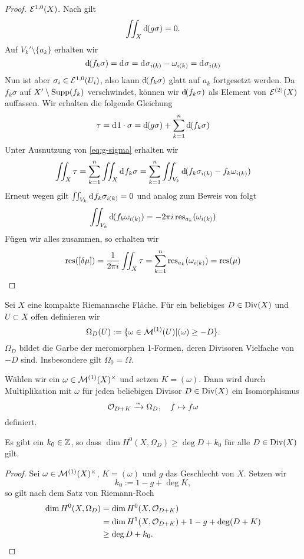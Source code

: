\begin{proof}
  $\mathcal{E}^{1,0}(X)$. Nach \cite[Satz 10.20]{For} gilt
  \begin{align}
  \iint_X \d[(g \sigma)] = 0. \label{eq:g-sigma}
  \end{align}
  Auf $V_k' \setminus \{a_k\}$ erhalten wir
  \[
  \d[(f_k \sigma)] = \d[\sigma] = \d[\sigma_{i(k)} - \omega_{i(k)}] =
  \d[\sigma_{i(k)}]
  \]
  Nun ist aber $\sigma_i \in \mathcal{E}^{1,0}(U_i)$, also kann $\d[(f_k
  \sigma)]$ glatt auf $a_k$ fortgesetzt werden. Da $f_k\sigma$ auf $X'
  \setminus \operatorname{Supp}(f_k)$ verschwindet, können wir $\d[(f_k \sigma)]$
  als Element von $\mathcal{E}^{(2)}(X)$ auffassen. Wir erhalten die
  folgende Gleichung
  \[
  \tau = \d[1 \cdot \sigma] = \d[(g\sigma)] + \sum_{k=1}^n \d[(f_k
  \sigma)]
  \]
  Unter Ausnutzung von \eqref{eq:g-sigma} erhalten wir
  \[
  \iint_X \tau = \sum_{k=1}^n \iint_X \d[f_k \sigma] = \sum_{k=1}^n
  \iint_{V_k} \d[(f_k\sigma_{i(k)} - f_k \omega_{i(k)} )]
  \]
  Erneut wegen \cite[Satz 10.20]{For} gilt $\iint_{V_k} \d[f_k \sigma_{i(k)}] = 0$ und
  analog zum Beweis von \cite[Satz 10.21]{For} folgt
  \[
  \iint_{V_k} \d[(f_k \omega_{i(k)})] = - 2\pi i
  \res_{a_k}(\omega_{i(k)})
  \]
  Fügen wir alles zusammen, so erhalten wir
  \[
  \operatorname{res}([\delta \mu]) = \frac{1}{2\pi i} \iint_X \tau = \sum_{k=1}^n
  \operatorname{res}_{a_k}(\omega_{i(k)}) = \operatorname{res}(\mu)
  \]
\end{proof}

\begin{defin}
  \label{def:garbe-div}
  Sei $X$ eine kompakte Riemannsche Fläche. Für ein beliebiges $D \in
  \operatorname{Div}(X)$ und $U \subset X$ offen definieren wir
  \[
  \Omega_D(U) := \{ \omega \in \mathcal{M}^{(1)}(U) | (\omega) \geq -D \}.
  \]
  $\Omega_D$ bildet die Garbe der meromorphen 1-Formen, deren
  Divisoren Vielfache von $-D$ sind. Insbesondere gilt $\Omega_0 = \Omega$.

  Wählen wir ein $\omega \in \mathcal{M}^{(1)}(X)^\times$ und setzen $K =
  (\omega)$. Dann wird durch Multiplikation mit $\omega$ für jeden
  beliebigen Divisor $D \in \operatorname{Div}(X)$ ein Isomorphismus
  \[
  \mathcal{O}_{D+K} \xrightarrow{\sim} \Omega_D, \quad f \mapsto f \omega
  \]
  definiert.
\end{defin}


\begin{lemma}
  \label{lemma:k0}
  Es gibt ein $k_0 \in \mathbb{Z}$, so dass $\dim H^0(X, \Omega_D) \geq \deg D
  + k_0$ für alle $D \in \operatorname{Div}(X)$ gilt.
\end{lemma}

\begin{proof}
  Sei $\omega \in \mathcal{M}^{(1)}(X)^\times$, $K = (\omega)$ und $g$ das
  Geschlecht von $X$. Setzen wir
  \[
  k_0 := 1 - g + \deg K,
  \]
  so gilt nach dem Satz von Riemann-Roch
  \begin{align*}
    \dim H^0(X, \Omega_D) & = \dim H^0(X, \mathcal{O}_{D+K}) \\
    & = \dim H^1(X, \mathcal{O}_{D+K}) + 1 - g + \deg(D+K) \\
    & \geq \deg D + k_0.
  \end{align*}
\end{proof}

